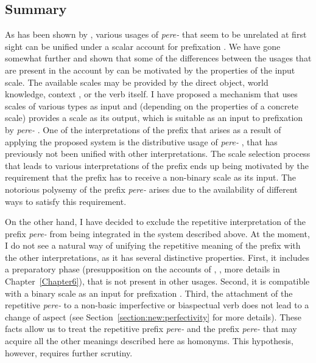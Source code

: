 \subsection{Summary}
As has been shown by \citet{Kagan:book}, various usages of \textit{pere-}   that seem to be unrelated at first sight can be unified under a scalar account for prefixation . We have gone somewhat further and shown that some of the differences between the usages that are present in the account by \citet{Kagan:book} can be motivated by the properties of the input scale. The available scales may be provided by the direct object, world knowledge, context  , or the verb itself. I have proposed a mechanism that uses scales of various types as input and (depending on the properties of a concrete scale) provides a scale as its output, which is suitable as an input to prefixation  by \textit{pere-}  . One of the interpretations of the prefix that arises as a result of applying the proposed system is the distributive  usage of \textit{pere-}  , that has previously not been unified with other interpretations. The scale selection process that leads to various interpretations of the prefix ends up being motivated by the requirement that the prefix has to receive a non-binary scale as its input. The notorious polysemy of the prefix \textit{pere-}   arises due to the availability of different ways to satisfy this requirement. 

On the other hand, I have decided to exclude the repetitive  interpretation of the prefix \textit{pere-}   from being integrated in the system described above. At the moment, I do not see a natural way of unifying the repetitive  meaning of the prefix with the other interpretations, as it has several distinctive properties. First, it includes a preparatory phase (presupposition on the accounts of \citealt{Demjjanow:97}, \citealt{Kagan:book}, more details in Chapter~\ref{Chapter6}), that is not present in other usages. Second, it is compatible with a binary scale as an input for prefixation . Third, the attachment of the repetitive  \textit{pere-}   to a non-basic imperfective or biaspectual verb  does not lead to a change of aspect (see Section~\ref{section:new:perfectivity} for more details). These facts allow us to treat the repetitive  prefix \textit{pere-}   and the prefix \textit{pere-}   that may acquire all the other meanings described here as homonyms. This hypothesis, however, requires further scrutiny.

